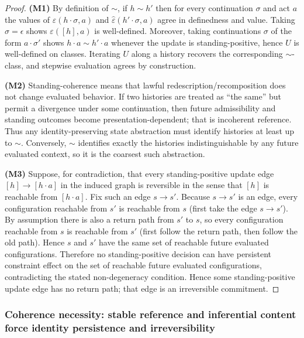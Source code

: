 \documentclass[11pt]{article}
\theoremstyle{definition}
\begin{document}
\begin{proof}
\textbf{(M1)} By definition of $\sim$, if $h\sim h'$ then for every continuation $\sigma$ and act $a$ the values of
$\hat\varepsilon(h\cdot\sigma,a)$ and $\hat\varepsilon(h'\cdot\sigma,a)$ agree in definedness and value.
Taking $\sigma=\epsilon$ shows $\varepsilon([h],a)$ is well-defined.
Moreover, taking continuations $\sigma$ of the form $a\cdot\sigma'$ shows $h\cdot a \sim h'\cdot a$ whenever the update is
standing-positive, hence $U$ is well-defined on classes.
Iterating $U$ along a history recovers the corresponding $\sim$-class, and stepwise evaluation agrees by construction.

\textbf{(M2)} Standing-coherence means that lawful redescription/recomposition does not change evaluated behavior.
If two histories are treated as ``the same'' but permit a divergence under some continuation, then future admissibility and
standing outcomes become presentation-dependent; that is incoherent reference.
Thus any identity-preserving state abstraction must identify histories at least up to $\sim$.
Conversely, $\sim$ identifies exactly the histories indistinguishable by any future evaluated context, so it is the coarsest
such abstraction.

\textbf{(M3)} Suppose, for contradiction, that every standing-positive update edge $[h]\to[h\cdot a]$ in the induced graph is
reversible in the sense that $[h]$ is reachable from $[h\cdot a]$.
Fix such an edge $s\to s'$.
Because $s\to s'$ is an edge, every configuration reachable from $s'$ is reachable from $s$ (first take the edge $s\to s'$).
By assumption there is also a return path from $s'$ to $s$, so every configuration reachable from $s$ is reachable from $s'$
(first follow the return path, then follow the old path).
Hence $s$ and $s'$ have the same set of reachable future evaluated configurations.
Therefore no standing-positive decision can have persistent constraint effect on the set of reachable future evaluated configurations,
contradicting the stated non-degeneracy condition.
Hence some standing-positive update edge has no return path; that edge is an irreversible commitment.
\end{proof}

\subsubsection{Coherence necessity: stable reference and inferential content force identity persistence and irreversibility}
\label{sec:coherence-necessity}
\end{document}
